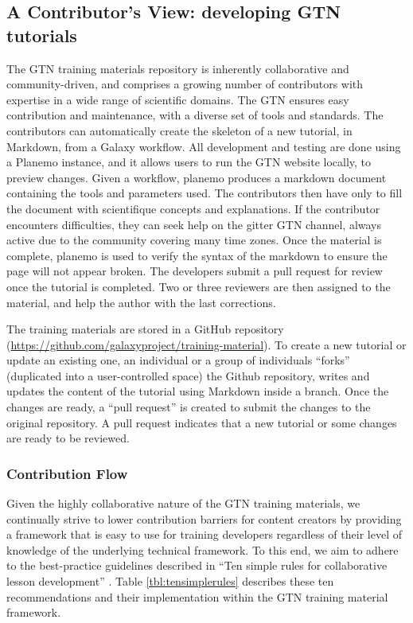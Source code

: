 \documentclass[10pt,letterpaper]{article}
\begin{document}
\subsection*{A Contributor's View: developing GTN tutorials}

The GTN training materials repository is inherently collaborative and community-driven, and comprises a growing number of contributors with expertise in a wide range of scientific domains.
The GTN ensures easy contribution and maintenance, with a diverse set of tools and standards.
The contributors can automatically create the skeleton of a new tutorial, in Markdown, from a Galaxy workflow.
All development and testing are done using a Planemo instance, and it allows users to run the GTN website locally, to preview changes.
Given a workflow, planemo produces a markdown document containing the tools and parameters used.
The contributors then have only to fill the document with scientifique concepts and explanations.
If the contributor encounters difficulties, they can seek help on the gitter GTN channel, always active due to the community covering many time zones.
Once the material is complete, planemo is used to verify the syntax of the markdown to ensure the page will not appear broken.
The developers submit a pull request for review once the tutorial is completed.
Two or three reviewers are then assigned to the material, and help the author with the last corrections.


The training materials are stored in a GitHub repository (\url{https://github.com/galaxyproject/training-material}).
To create a new tutorial or update an existing one, an individual or a group of individuals “forks” (duplicated into a user-controlled space) the Github repository, writes and updates the content of the tutorial using Markdown inside a branch.
Once the changes are ready, a “pull request” is created to submit the changes to the original repository.
A pull request indicates that a new tutorial or some changes are ready to be reviewed.

\subsubsection*{Contribution Flow}
Given the highly collaborative nature of the GTN training materials, we continually strive to lower contribution barriers for content creators by providing a framework that is easy to use for training developers regardless of their level of knowledge of the underlying technical framework.
To this end, we aim to adhere to the best-practice guidelines described in  “Ten simple rules for collaborative lesson development” \cite{TODO}.
Table \ref{tbl:tensimplerules} describes these ten recommendations and their implementation within the GTN training material framework.
\end{document}
